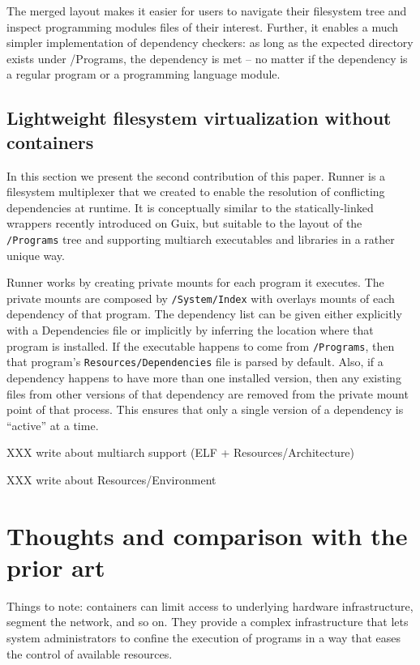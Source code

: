 \documentclass[sigplan, anonymous, 10pt]{acmart}
\begin{document}
The merged layout makes it easier for users to navigate their filesystem tree
and inspect programming modules files of their interest. Further, it enables a
much simpler implementation of dependency checkers: as long as the expected
directory exists under /Programs, the dependency is met -- no matter if the
dependency is a regular program or a programming language module.

\subsection{Lightweight filesystem virtualization without containers}
In this section we present the second contribution of this paper. Runner is a
filesystem multiplexer that we created to enable the resolution of conflicting
dependencies at runtime. It is conceptually similar to the statically-linked
wrappers recently introduced on Guix, but suitable to the layout of the
\texttt{/Programs} tree and supporting multiarch executables and libraries
in a rather unique way.

Runner works by creating private mounts for each program it executes. The
private mounts are composed by \texttt{/System/Index} with overlays mounts
of each dependency of that program. The dependency list can be given either
explicitly with a Dependencies file or implicitly by inferring the location
where that program is installed. If the executable happens to come from
\texttt{/Programs}, then that program's \texttt{Resources/Dependencies}
file is parsed by default. Also, if a dependency happens to have more than
one installed version, then any existing files from other versions of that
dependency are removed from the private mount point of that process. This
ensures that only a single version of a dependency is ``active'' at a time.

XXX write about multiarch support (ELF + Resources/Architecture)
\lipsum[7]

XXX write about Resources/Environment
\lipsum[8]

\section{Thoughts and comparison with the prior art}
Things to note: containers can limit access to underlying hardware infrastructure, segment the
network, and so on. They provide a complex infrastructure that lets system administrators to
confine the execution of programs in a way that eases the control of available resources.
\end{document}
